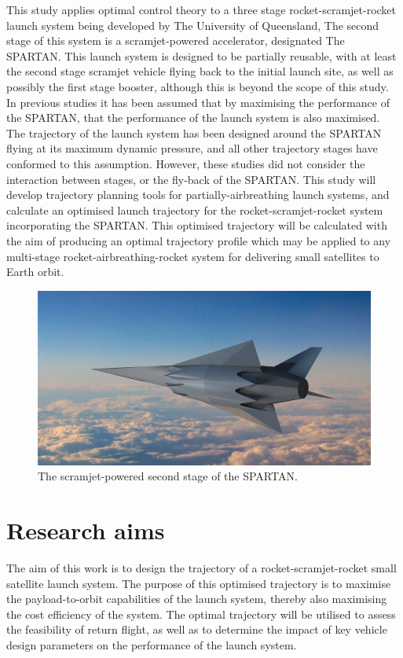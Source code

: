   	   This study applies optimal control theory to a three stage rocket-scramjet-rocket launch system being developed by The University of Queensland, The second stage of this system is a scramjet-powered accelerator, designated The SPARTAN\cite{Preller2017b}. This launch system is designed to be partially reusable, with at least the second stage scramjet vehicle flying back to the initial launch site, as well as possibly the first stage booster, although this is beyond the scope of this study. 
  	   In previous studies it has been assumed that by maximising the performance of the SPARTAN, that the performance of the launch system is also maximised. 
  	   The trajectory of the launch system has been designed around the SPARTAN flying at its
  	   maximum dynamic pressure, and all other trajectory stages have conformed to this assumption. However, these studies did not consider the interaction between stages, or the fly-back of the SPARTAN.
  	   This study will develop trajectory planning tools for partially-airbreathing launch systems, and calculate an optimised launch trajectory for the rocket-scramjet-rocket system incorporating the SPARTAN. This optimised trajectory will be calculated with the aim of producing an optimal
  	   trajectory profile which may be applied to any multi-stage rocket-airbreathing-rocket system for delivering small
  	   satellites to Earth orbit. 
  	   
  	  	\begin{figure}[ht]
  	  		\centering
  	  		\includegraphics[width=0.7\linewidth]{figures/1_introduction/project-spartan}
  	  		\caption{The scramjet-powered second stage of the SPARTAN\cite{BBC}.}
  	  		\label{fig:project-spartan}
  	  	\end{figure}
  	  	

  \section{Research aims}

    The aim of this work is to design the trajectory of a rocket-scramjet-rocket small satellite launch system. The purpose of this optimised trajectory is to maximise the payload-to-orbit capabilities of the launch system, thereby also maximising the cost efficiency of the system. The optimal trajectory will be utilised to assess the feasibility of return flight, as well as to determine the impact of key vehicle design parameters on the performance of the launch system. 
 
